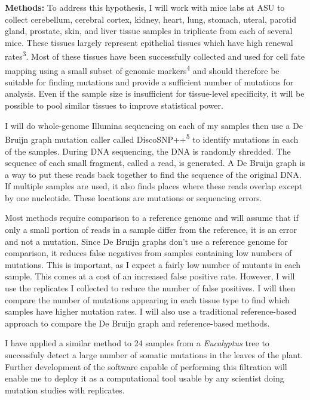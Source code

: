 \documentclass[12pt]{article}
\begin{document}
\textbf{Methods:}
To address this hypothesis, I will work with mice labs at ASU to collect cerebellum, cerebral cortex, kidney, heart, lung, stomach, uteral, parotid gland, prostate, skin, and liver tissue samples in triplicate from each of several mice. These tissues largely represent epithelial tissues which have high renewal rates\textsuperscript{3}. %
Most of these tissues have been successfully collected and used for cell fate mapping using a small subset of genomic markers\textsuperscript{4} and should therefore be suitable for finding mutations and provide a sufficient number of mutations for analysis. Even if the sample size is insufficient for tissue-level specificity, it will be possible to pool similar tissues to improve statistical power.

I will do whole-genome Illumina sequencing on each of my samples then use a De Bruijn graph mutation caller called DiscoSNP++\textsuperscript{5} to identify mutations in each of the samples. During DNA sequencing, the DNA is randomly shredded. The sequence of each small fragment, called a read, is generated. A De Bruijn graph is a way to put these reads back together to find the sequence of the original DNA. If multiple samples are used, it also finds places where these reads overlap except by one nucleotide. These locations are mutations or sequencing errors.

Most methods require comparison to a reference genome and will assume that if only a small portion of reads in a sample differ from the reference, it is an error and not a mutation. Since De Bruijn graphs don't use a reference genome for comparison, it reduces false negatives from samples containing low numbers of mutations. This is important, as I expect a fairly low number of mutants in each sample. This comes at a cost of an increased false positive rate. However, I will use the replicates I collected to reduce the number of false positives. I will then compare the number of mutations appearing in each tissue type to find which samples have higher mutation rates. I will also use a traditional reference-based approach to compare the De Bruijn graph and reference-based methods.

I have applied a similar method to 24 samples from a \textit{Eucalyptus} tree to successfuly detect a large number of somatic mutations in the leaves of the plant. Further development of the software capable of performing this filtration will enable me to deploy it as a computational tool usable by any scientist doing mutation studies with replicates.
\end{document}
